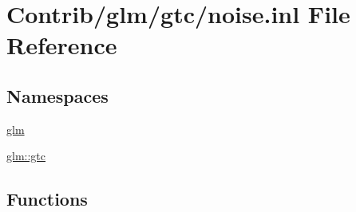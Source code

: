 \hypertarget{noise_8inl}{}\section{Contrib/glm/gtc/noise.inl File Reference}
\label{noise_8inl}
\subsection*{Namespaces}
\begin{DoxyCompactItemize}
\item 
 \mbox{\hyperlink{namespaceglm}{glm}}
\item 
 \mbox{\hyperlink{namespaceglm_1_1gtc}{glm\+::gtc}}
\end{DoxyCompactItemize}
\subsection*{Functions}
